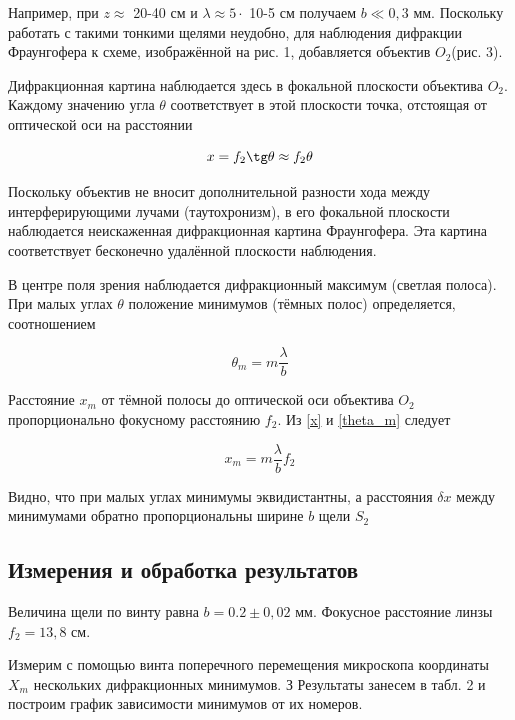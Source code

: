 Например, при $ z \approx$ 20-40 см и $ \lambda \approx 5 \cdot $ 10-5  см получаем $b \ll 0,3$ мм. Поскольку работать с такими тонкими щелями неудобно, для наблюдения дифракции Фраунгофера к схеме, изображённой на рис. 1, добавляется объектив $ O_2  $(рис. 3).

Дифракционная картина наблюдается здесь в фокальной плоскости
объектива $ O_2 $. Каждому значению угла $ \theta $ соответствует в этой плоскости точка, отстоящая от оптической оси на расстоянии

\begin{equation}\label{x}
x = f_2 \tg \theta \approx f_2 \theta
\end{equation}

Поскольку объектив не вносит дополнительной разности хода
между интерферирующими лучами (таутохронизм), в его фокальной
плоскости наблюдается неискаженная дифракционная картина Фраунгофера. Эта картина соответствует бесконечно удалённой плоскости
наблюдения.

В центре поля зрения наблюдается дифракционный максимум (светлая полоса). При малых углах $ \theta $ положение минимумов (тёмных полос)
определяется, соотношением

\begin{equation}\label{theta_m}
\theta_m = m \dfrac{\lambda}{b}
\end{equation}

Расстояние $ x_m $ от тёмной полосы до оптической оси объектива $ O_2 $ пропорционально фокусному расстоянию $ f_2 $. Из \eqref{x} и \eqref{theta_m} следует 

\begin{equation}\label{xm}
x_m = m \dfrac{\lambda}{b} f_2
\end{equation}

Видно, что при малых углах минимумы эквидистантны, а
расстояния $ \delta x $ между минимумами обратно пропорциональны ширине $ b $ щели $ S_2 $


\subsection{Измерения и обработка результатов}

Величина щели по винту равна $ b = 0.2 \pm 0,02 $ мм. Фокусное расстояние линзы $ f_2 = 13,8 $ см.

Измерим с помощью винта поперечного перемещения микроскопа координаты $ X_m $ нескольких дифракционных минимумов. З
Результаты занесем в табл. 2 и построим график зависимости минимумов от их номеров. 


